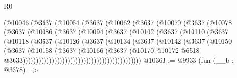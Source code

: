 \begin{lexlean}{R0}
\begin{coremodule}
                            (@10046
                              (@3637
                                (@10054
                                  (@3637
                                    (@10062
                                      (@3637
                                        (@10070
                                          (@3637
                                            (@10078
                                              (@3637
                                                (@10086
                                                  (@3637
                                                    (@10094
                                                      (@3637
                                                        (@10102
                                                          (@3637
                                                            (@10110
                                                              (@3637
                                                                (@10118
                                                                  (@3637
                                                                    (@10126
                                                                      (@3637
                                                                        (@10134
                                                                          (@3637
                                                                            (@10142
                                                                              (@3637
                                                                                (@10150
                                                                                  (@3637
                                                                                    (@10158
                                                                                      (@3637
                                                                                        (@10166
                                                                                          (@3637
                                                                                            (@10170
                                                                                              @10172
                                                                                              @6518
                                                                                              @3633)))))))))))))))))))))))))))))))))))))))))))))
@10363 := @9933
    (fun (__b : @3378) =>

\end{coremodule}
\end{lexlean}
